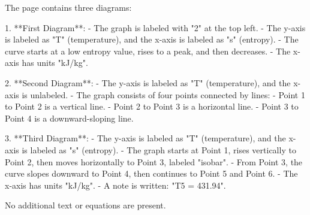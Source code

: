 The page contains three diagrams:  

1. **First Diagram**:  
   - The graph is labeled with "2" at the top left.  
   - The y-axis is labeled as "T" (temperature), and the x-axis is labeled as "s" (entropy).  
   - The curve starts at a low entropy value, rises to a peak, and then decreases.  
   - The x-axis has units "kJ/kg".  

2. **Second Diagram**:  
   - The y-axis is labeled as "T" (temperature), and the x-axis is unlabeled.  
   - The graph consists of four points connected by lines:  
     - Point 1 to Point 2 is a vertical line.  
     - Point 2 to Point 3 is a horizontal line.  
     - Point 3 to Point 4 is a downward-sloping line.  

3. **Third Diagram**:  
   - The y-axis is labeled as "T" (temperature), and the x-axis is labeled as "s" (entropy).  
   - The graph starts at Point 1, rises vertically to Point 2, then moves horizontally to Point 3, labeled "isobar".  
   - From Point 3, the curve slopes downward to Point 4, then continues to Point 5 and Point 6.  
   - The x-axis has units "kJ/kg".  
   - A note is written: "T5 = 431.94".  

No additional text or equations are present.